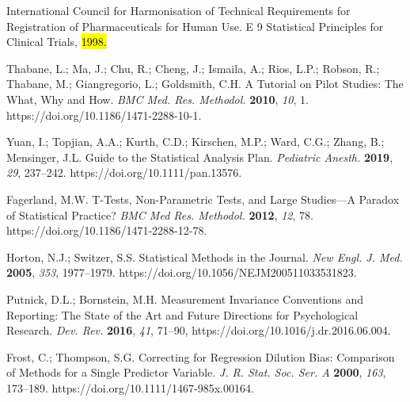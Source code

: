 \documentclass[psych,tutorial,accept,moreauthors,pdftex]{Definitions/mdpi}
\begin{document}
\begin{thebibliography}{999}
International Council for Harmonisation of Technical Requirements for Registration of Pharmaceuticals for Human Use. E 9 Statistical Principles for Clinical Trials, \hl{1998.}%


Thabane, L.; Ma, J.; Chu, R.; Cheng, J.; Ismaila, A.; Rios, L.P.; Robson, R.; Thabane, M.; Giangregorio, L.; Goldsmith, C.H. A Tutorial on Pilot Studies: The What, Why and How. \emph{BMC Med. Res. Methodol.} \textbf{2010}, \emph{10}, 1. https://doi.org/10.1186/1471-2288-10-1.


Yuan, I.; Topjian, A.A.; Kurth, C.D.; Kirschen, M.P.; Ward, C.G.; Zhang, B.; Mensinger, J.L. Guide to the Statistical Analysis Plan. \emph{Pediatric Anesth.} \textbf{2019}, \emph{29}, 237--242. https://doi.org/10.1111/pan.13576.


Fagerland, M.W. T-Tests, Non-Parametric Tests, and Large Studies—A Paradox of Statistical Practice? \emph{BMC Med Res. Methodol.} \textbf{2012}, \emph{12}, 78. https://doi.org/10.1186/1471-2288-12-78.


Horton, N.J.; Switzer, S.S. Statistical Methods in the Journal. \emph{New Engl. J. Med.} \textbf{2005}, \emph{353}, 1977--1979. https://doi.org/10.1056/\linebreak NEJM200511033531823.


Putnick, D.L.; Bornstein, M.H. Measurement Invariance Conventions and Reporting: The State of the Art and Future Directions for Psychological Research. \emph{Dev. Rev.} \textbf{2016}, \emph{41}, 71--90, https://doi.org/10.1016/j.dr.2016.06.004.


Frost, C.; Thompson, S.G. Correcting for Regression Dilution Bias: Comparison of Methods for a Single Predictor Variable. \emph{J. R. Stat. Soc. Ser. A} \textbf{2000}, \emph{163}, 173--189. https://doi.org/10.1111/1467-985x.00164.


\end{thebibliography}
\end{document}
